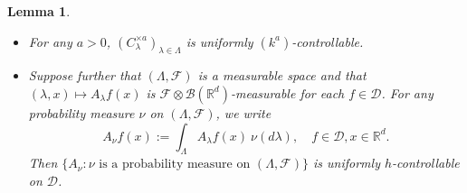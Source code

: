 \documentclass[12pt,a4paper]{amsart}
\theoremstyle{plain}
\newtheorem{lem}[thm]{Lemma}
\theoremstyle{definition}
\numberwithin{equation}{section}
\begin{document}
\begin{lem}
\begin{itemize}
  \item[(3)] 
    For any $a>0$, $(C^{\times a}_\lambda)_{\lambda \in \Lambda}$ is uniformly $(k^a)$-controllable.
  \item[(4)]
    Suppose further that $(\Lambda, \mathscr F)$ is a measurable space and that $(\lambda,x)\mapsto A_\lambda f(x)$ is $\mathscr F \otimes \mathscr B(\mathbb R^d)$-measurable for each $f\in \mathcal D$.
    For any probability measure $\nu$ on $(\Lambda, \mathscr F)$,  we write
    \[
      A_\nu f(x)
      := \int_{\Lambda} A_\lambda f (x)~\nu(d\lambda),
      \quad f\in \mathcal D, x\in \mathbb R^d.
    \]
    Then  $\{A_\nu: \nu \text{ is  a probability measure on } (\Lambda, \mathscr F)\}$ is uniformly $h$-controllable on $\mathcal D$.
  \end{itemize}
\end{lem}
\end{document}
